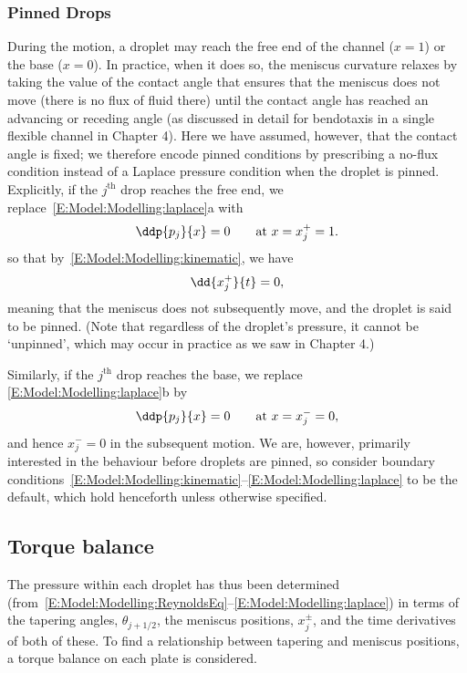 \subsubsection{Pinned Drops}\label{S:Model:Model:Pinned}
During the motion, a droplet may reach the free end of the channel ($x = 1$) or the base ($x =0$). In practice, when it does so, the meniscus curvature relaxes by taking the value of the contact angle that ensures that the meniscus does not move (there is no flux of fluid there) until the contact angle has reached an advancing or receding angle (as discussed in detail for bendotaxis in a single flexible channel in Chapter 4). Here we have assumed, however, that the contact angle is fixed; we therefore encode pinned conditions by prescribing a no-flux condition instead of a Laplace pressure condition when the droplet is pinned. Explicitly, if the $j^\text{th}$ drop reaches the free end, we replace~\eqref{E:Model:Modelling:laplace}a with
\begin{equation}\label{E:Model:Modelling:kinematicPinned1}
\ddp{p_j}{x} = 0 \qquad \text{at}~x = x_j^+ = 1.
\end{equation}
so that by~\eqref{E:Model:Modelling:kinematic}, we have
\begin{equation}\label{E:Model:Modelling:kinematicPinned2}
\dd{\xrightj}{t} = 0,
\end{equation}
meaning that the meniscus does not subsequently move, and the droplet is said to be pinned. (Note that regardless of the droplet's pressure, it cannot be `unpinned', which may occur in practice as we saw in Chapter 4.)

Similarly, if the $j^\text{th}$ drop reaches the base, we replace \eqref{E:Model:Modelling:laplace}b by
\begin{equation}\label{E:Model:Modelling:kinematicPinned3}
\ddp{p_j}{x} = 0 \qquad \text{at}~x = x_j^- = 0,
\end{equation}
and hence $x_j^- = 0$ in the subsequent motion. We are, however, primarily interested in the behaviour before droplets are pinned, so consider boundary conditions~\eqref{E:Model:Modelling:kinematic}--\eqref{E:Model:Modelling:laplace} to be the default, which hold henceforth unless otherwise specified.

\subsection{Torque balance}
The pressure within each droplet has thus been determined (from~\eqref{E:Model:Modelling:ReynoldsEq}--\eqref{E:Model:Modelling:laplace}) in terms of the tapering angles, $\theta_{j+1/2}$,  the meniscus positions, $x_j^{\pm}$, and the time derivatives of both of these. To find a relationship between tapering and meniscus positions, a torque balance on each plate is considered.

